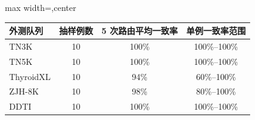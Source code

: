 \begin{responsetable}
\caption{}
\begin{adjustbox}{max width=\textwidth,center}
\begin{tabular}{lccc}
\toprule
外测队列 & 抽样例数 & 5 次路由平均一致率 & 单例一致率范围 \\
\midrule
TN3K & 10 & 100\% & 100\%--100\% \\
TN5K & 10 & 100\% & 100\%--100\% \\
ThyroidXL & 10 & 94\% & 60\%--100\% \\
ZJH-8K & 10 & 98\% & 80\%--100\% \\
DDTI & 10 & 100\% & 100\%--100\% \\
\bottomrule
\end{tabular}
\end{adjustbox}
\end{responsetable}

